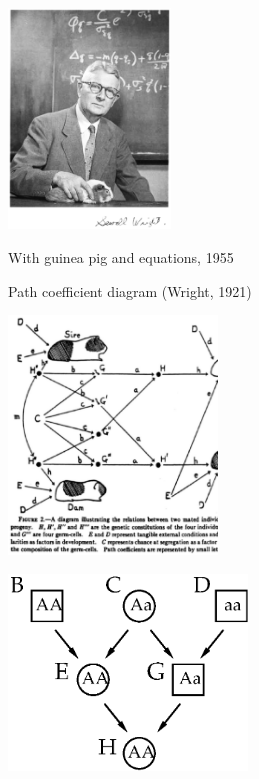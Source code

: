 \documentclass[bluish,slideColor,colorBG,pdf]{prosper}
\begin{document}
\begin{slide}[Replace]{}

\centerline{\includegraphics[width=1.7in]{wrightgp2.ps}}
\medskip

\centerline{With guinea pig and equations, 1955}

\end{slide}

\begin{slide}[Replace]{Path coefficient diagram (Wright, 1921) }

\centerline{\includegraphics[height=2.5in]{pathgraph.ps}}

\end{slide}

\begin{slide}[Replace]{}

\centerline{\includegraphics[width=2.5in]{fig5-2.ps}}

\end{slide}
\end{document}
